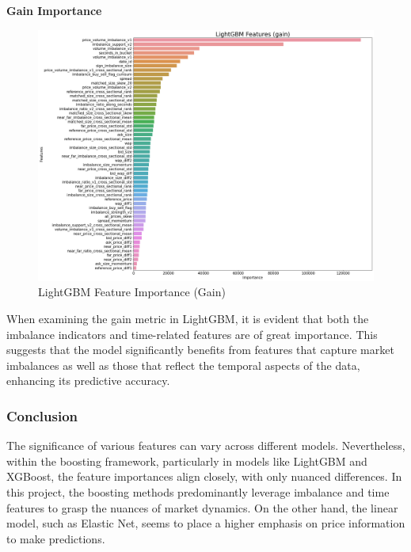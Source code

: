 \documentclass[12pt]{article}
\newtheorem{Proof of Lemma}{Proof of Lemma}
\begin{document}
\noindent \textbf{Gain Importance}
\begin{figure}[H]
  \centering
  \includegraphics[width=1\linewidth]{images/lgb_gain.png}
  \caption{LightGBM Feature Importance (Gain)}
  \label{fig:lgb_gain}
\end{figure}

When examining the gain metric in LightGBM, it is evident that both the imbalance indicators and time-related features are of great importance. This suggests that the model significantly benefits from features that capture market imbalances as well as those that reflect the temporal aspects of the data, enhancing its predictive accuracy.


\subsubsection*{Conclusion}

The significance of various features can vary across different models. Nevertheless, within the boosting framework, particularly in models like LightGBM and XGBoost, the feature importances align closely, with only nuanced differences. In this project, the boosting methods predominantly leverage imbalance and time features to grasp the nuances of market dynamics. On the other hand, the linear model, such as Elastic Net, seems to place a higher emphasis on price information to make predictions.
\end{document}
